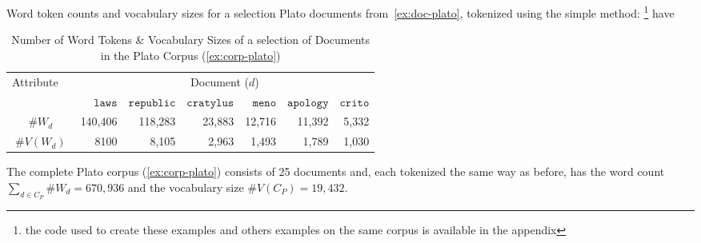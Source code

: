\begin{example}
  Word token counts and vocabulary sizes for a selection Plato documents from~\ref{ex:doc-plato}, tokenized using the simple method: \footnote{the code used to create these examples and others examples on the same corpus is available in the appendix} have 
  \vspace{6pt}
  \begin{table}[h]
    \centering
    \begin{tabular}{c r r r r r r}
      \toprule
      \multicolumn{1}{c}{Attribute$\quad$} &
      \multicolumn{6}{c}{Document ($d$)} \\

      \cmidrule(lr){2-7}
      &
      $\texttt{laws}$ &
      $\texttt{republic}$ &
      $\texttt{cratylus}$ &
      $\texttt{meno}$ &
      $\texttt{apology}$ &
      $\texttt{crito}$ \\
      \midrule
      $\#W_d$ & 140,406 & 118,283 & 23,883 & 12,716 & 11,392 & 5,332\\
      $\#V(W_d)$ & 8100 & 8,105 & 2,963 & 1,493 & 1,789 & 1,030\\
      \bottomrule
    \end{tabular}
    \caption{Number of Word Tokens \& Vocabulary Sizes of a selection of Documents in the Plato Corpus (\autoref{ex:corp-plato})}
  \end{table}
\end{example}
\vspace{6pt}

\begin{example}
  The complete Plato corpus (\ref{ex:corp-plato}) consists of 25 documents and, each tokenized the same way as before, has the word count $\sum_{d\in C_P}\#W_d=670,936$ and the vocabulary size $\#V(C_P)=19,432$.
\end{example}
